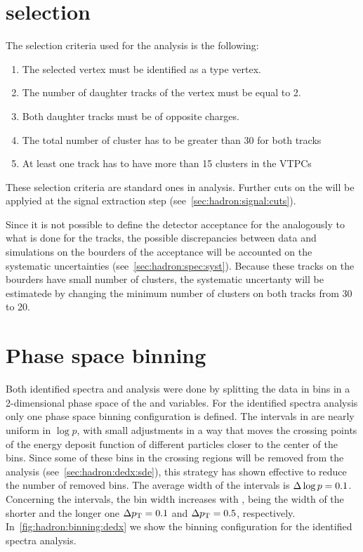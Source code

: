 \section{\vzero selection}
\label{sec:hadron:vzeroselection}


The \vzero selection criteria used for the \vzero analysis
is the following:
\begin{enumerate}[label=(\roman*)]
\item The selected vertex must be identified as a \vzero type vertex.
\item The number of daughter tracks of the vertex must be equal to 2.
\item Both daughter tracks must be of opposite charges.
\item The total number of cluster has to be greater than 30 for both tracks
\item At least one track has to have more than 15 clusters in the VTPCs
\end{enumerate}
These selection criteria are standard ones in \NASixtyOne analysis.
Further cuts on the \vzeros will be applyied at the signal extraction
step (see~\cref{sec:hadron:signal:cuts}).

Since it is not possible to define the detector acceptance for
the \vzeros analogously to what is done for the tracks, the possible
discrepancies between data and simulations on the bourders of the acceptance
will be accounted on the systematic uncertainties (see~\cref{sec:hadron:spec:syst}).
Because these tracks on the bourders have small number of clusters,
the systematic uncertanty will be estimatede by changing the minimum number
of clusters on both tracks from 30 to 20. 


\section{Phase space binning}


Both identified spectra and \vzero analysis were done
by splitting the data in bins in a 2-dimensional
phase space of the \pp and \pT variables. For the
identified spectra analysis only one phase space
binning configuration is defined. The intervals in \pp
are nearly uniform in $\log p$, with small adjustments in a way
that moves the crossing points of the energy deposit function
of different particles closer to the center of the bins.
Since some of these bins in the crossing regions
will be removed from the analysis (see~\cref{sec:hadron:dedx:sde}),
this strategy has shown effective to reduce the number of
removed bins. The average width of the \pp intervals is
$\Delta\log p=0.1$. Concerning the \pT intervals, the bin width
increases with \pT, being the width of the shorter and the longer one
$\Delta p_\text{T}=0.1$ and  $\Delta p_\text{T}=0.5$, respectively.  
In~\cref{fig:hadron:binning:dedx} we show the binning configuration
for the identified spectra analysis.



